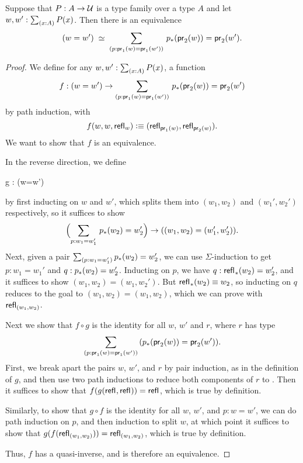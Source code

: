 \begin{thm}\label{thm:path-sigma}
Suppose that $P:A\to\mathcal{U}$ is a type family over a type $A$ and let $w,w':\sm{x:A}P(x)$. Then there is an equivalence
\begin{equation*}
\eqvspaced{(w=w')}{\dsm{p:\proj{1}(w)=\proj{1}(w')} \trans{p}{\proj{2}(w)}=\proj{2}(w')}.
\end{equation*}
\end{thm}

\begin{proof}
We define for any $w,w':\sm{x:A}P(x)$, a function
\begin{equation*}
f: (w=w') \to \dsm{p:\proj{1}(w)=\proj{1}(w')} \trans{p}{\proj{2}(w)}=\proj{2}(w')
\end{equation*}
by path induction, with
\begin{equation*}
f(w,w,\mathsf{refl}_{w})\vcentcolon\equiv(\mathsf{refl}_{\mathsf{pr}_{1}(w)},\mathsf{refl}_{\mathsf{pr}_{2}(w)}).
\end{equation*}
We want to show that $f$ is an equivalence.

In the reverse direction, we define
\begin{narrowmultline*}
  g :  
      \to
      \narrowbreak
      (w=w')
\end{narrowmultline*}
by first inducting on $w$ and $w'$, which splits them into $(w_1,w_2)$ and
$(w_1',w_2')$ respectively, so it suffices to show 
\begin{equation*}
\Parens{\sm{p:w_1 = w_1'}\trans{p}{w_2}=w_2'} \to ((w_1,w_2)=(w_1',w_2')).
\end{equation*}
Next, given a pair $\sm{p:w_1 = w_1'}\trans{p}{w_2}=w_2'$, we can
use $\Sigma$-induction to get $p : w_1 = w_1'$ and $q :
{p}_{*}\mathopen{}\left({w_2}\right)\mathclose{}=w_2'$.  Inducting on $p$, we have $q :
{\mathsf{refl}_{}}_{*}\mathopen{}\left({w_2}\right)\mathclose{}=w_2'$, and it suffices to show 
$(w_1,w_2)=(w_1,w_2')$.  But ${\mathsf{refl}_{}}_{*}\mathopen{}\left({w_2}\right)\mathclose{} \equiv w_2$, so
inducting on $q$ reduces to the goal to 
$(w_1,w_2)=(w_1,w_2)$, which we can prove with $\mathsf{refl}_{(w_1,w_2)}$.  

Next we show that $f \circ g$ is the identity for all $w$, $w'$ and
$r$, where $r$ has type
\[\dsm{p:\proj{1}(w)=\proj{1}(w')} (\trans{p}{\proj{2}(w)}=\proj{2}(w')).\]
First, we break apart the pairs $w$, $w'$, and $r$ by pair induction, as in the
definition of $g$, and then use two path inductions to reduce both components
of $r$ to .  Then it suffices to show that 
$f (g(\mathsf{refl}_{},\mathsf{refl}_{})) = \mathsf{refl}_{}$, which is true by definition.

Similarly, to show that $g \circ f$ is the identity for all $w$, $w'$,
and $p : w = w'$, we can do path induction on $p$, and then induction to
split $w$, at which point it suffices to show that
$g(f (\mathsf{refl}_{(w_1,w_2)})) = \mathsf{refl}_{(w_1,w_2)}$, which is true by
definition.

Thus, $f$ has a quasi-inverse, and is therefore an equivalence.  
\end{proof}

